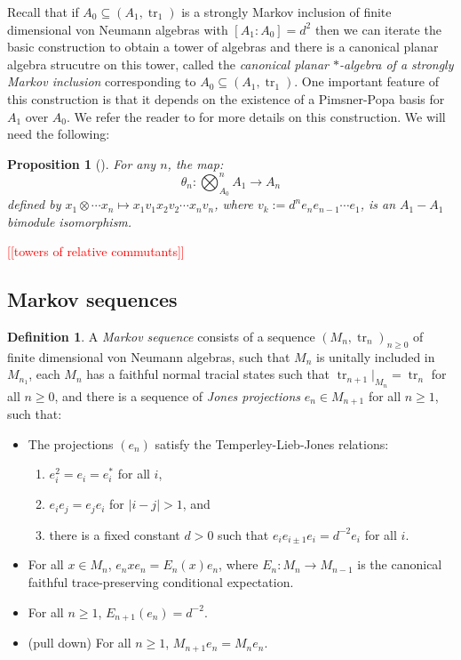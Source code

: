 \documentclass[11pt]{article}
\theoremstyle{plain}
\newtheorem{prop}[thm]{Proposition}
\theoremstyle{definition}
\newtheorem{defn}[thm]{Definition}
\DeclareMathOperator{\tr}{tr}
\newcommand{\nn}[1]{\textcolor{red}{[[#1]]}}
\begin{document}
Recall that if $A_0\subseteq (A_1,\tr_1)$ is a strongly Markov inclusion of finite dimensional von Neumann algebras with $[A_1:A_0]=d^2$ then we can iterate the basic construction to obtain a tower of algebras and there is a canonical planar algebra strucutre on this tower, called the \textit{canonical planar $\ast$-algebra of a strongly Markov inclusion} corresponding to $A_0\subseteq (A_1,\tr_1)$. One important feature of this construction is that it depends on the existence of a Pimsner-Popa basis for $A_1$ over $A_0$. 
We refer the reader to \cite{MR2812459} for more details on this construction. 
We will need the following:

\begin{prop}[{\cite[Prop 2.25]{MR2812459}}]\label{iso}
For any $n$, the map:
\[
\theta_n: \bigotimes_{A_0}^{n}A_1 \rightarrow A_n
\]
defined by $x_1\otimes\cdots x_n \mapsto x_1v_1x_2v_2\cdots x_nv_n$, where $v_k:=d^ne_ne_{n-1}\cdots e_1$, is an $A_1-A_1$ bimodule isomorphism.
\end{prop}

\nn{towers of relative commutants}


\subsection{Markov sequences}


\begin{defn}
A \emph{Markov sequence} consists of a sequence $(M_n, \tr_n)_{n\geq 0}$ of finite dimensional von Neumann algebras, such that $M_n$ is unitally included in $M_{n_1}$, each $M_n$ has a faithful normal tracial states such that $\tr_{n+1}|_{M_n} = \tr_n$ for all $n\geq 0$, and there is a sequence of \emph{Jones projections} $e_n \in M_{n+1}$ for all $n\geq 1$, such that:
\begin{itemize}
\item
The projections $(e_n)$ satisfy the Temperley-Lieb-Jones relations:
\begin{enumerate}[(1)]
\item
$e_i^2 = e_i = e_i^*$ for all $i$,
\item
$e_i e_j = e_j e_i$ for $|i-j|>1$, and
\item
there is a fixed constant $d>0$ such that $e_{i} e_{i\pm 1} e_i = d^{-2} e_i$ for all $i$.
\end{enumerate}
\item
For all $x\in M_n$, $e_n x e_n = E_n(x)e_n$, where $E_n: M_n \to M_{n-1}$ is the canonical faithful trace-preserving conditional expectation.
\item
For all $n\geq 1$, $E_{n+1}(e_n) = d^{-2}$.
\item
(pull down)
For all $n\geq 1$, $M_{n+1}e_n = M_n e_n$.

\end{itemize}
\end{defn}
\end{document}
